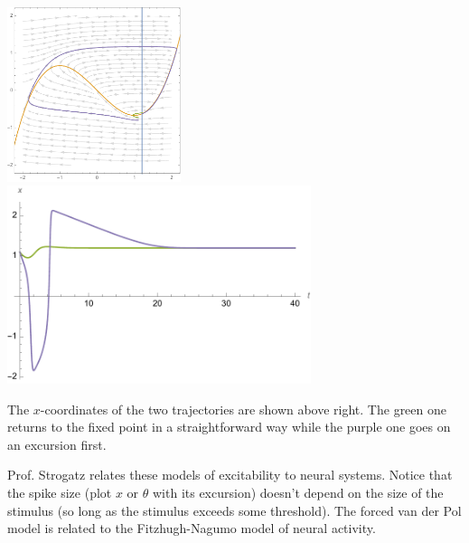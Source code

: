 \documentclass[12pt,letterpaper,answers]{exam}
\begin{document}
\begin{questions}
\begin{parts}
\begin{solution}
\includegraphics[width=2in]{img/H-07-3e-01}
\includegraphics[width=3.5in]{img/H-07-3e-02}

The $x$-coordinates of the two trajectories are shown above right.  The green one returns to the fixed point in a straightforward way while the purple one goes on an excursion first.
\end{solution} 

Prof. Strogatz relates these models of excitability to neural systems.  Notice that the spike size (plot $x$ or $\theta$ with its excursion) doesn't depend on the size of the stimulus (so long as the stimulus exceeds some threshold).  The forced van der Pol model is related to the Fitzhugh-Nagumo model of neural activity. 
\end{parts}



\end{questions}
\end{document}
